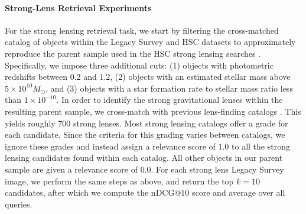 \documentclass[]{polymathic}
\begin{document}
\paragraph{Strong-Lens Retrieval Experiments} For the strong lensing retrieval task, we start by filtering the cross-matched catalog of objects within the Legacy Survey and HSC datasets to approximately reproduce the parent sample used in the HSC strong lensing searches \cite{SUGOHI_X}. Specifically, we impose three additional cuts: (1) objects with photometric redshifts between 0.2 and 1.2, (2) objects with an estimated stellar mass above $5\times 10^{10} M_\odot$, and (3) objects with a star formation rate to stellar mass ratio less than $1 \times 10^{-10}$. In order to identify the strong gravitational lenses within the resulting parent sample, we cross-match with previous lens-finding catalogs \cite{SUGOHI_I,SUGOHI_II,SUGOHI_III,SUGOHI_V,SUGOHI_VI,SUGOHI_VIII,SUGOHI_X,HOLISMOKES_VI,HOLISMOKES_VIII,HOLISMOKES_XIII,rui2019,talbot2021,bina2016,bolton2006,bolton2008,ruff2011,more2014,Faure2008,Jacobs2019,Goullaud2018,Oguri2012}. This yields roughly 700 strong lenses. Most strong lensing catalogs offer a grade for each candidate. Since the criteria for this grading varies between catalogs, we ignore these grades and instead assign a relevance score of $1.0$ to all the strong lensing candidates found within each catalog. All other objects in our parent sample are given a relevance score of $0.0$. For each strong lens Legacy Survey image, we perform the same steps as above, and return the top $k=10$ candidates, after which we compute the $\mathrm{nDCG@}10$ score and average over all queries.
\end{document}
